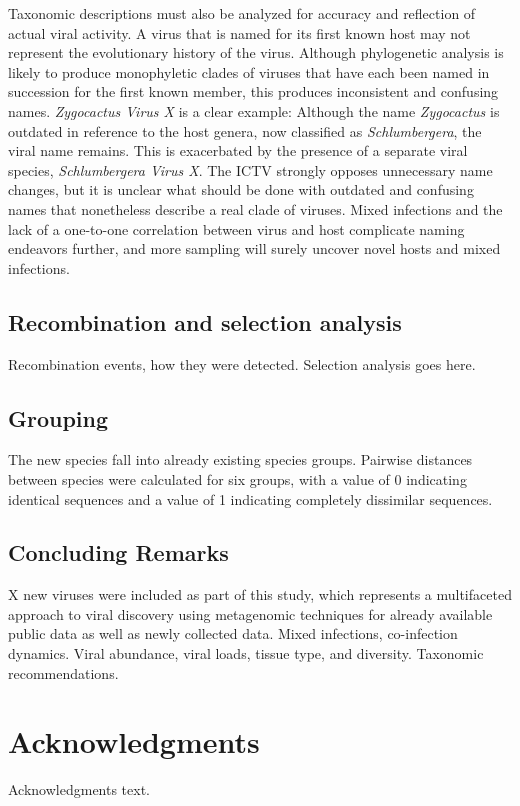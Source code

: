 \documentclass[11pt,letterpaper,titlepage]{article}
\begin{document}
\begin{linenumbers}
Taxonomic descriptions must also be analyzed for accuracy and reflection of actual viral activity. 
A virus that is named for its first known host may not represent the evolutionary history of the virus.
Although phylogenetic analysis is likely to produce monophyletic clades of viruses that have each been named in succession for the first known member, this produces inconsistent and confusing names.
\textit{Zygocactus Virus X} is a clear example: Although the name \textit{Zygocactus} is outdated in reference to the host genera, now classified as \textit{Schlumbergera}, the viral name remains.
This is exacerbated by the presence of a separate viral species, \textit{Schlumbergera Virus X}.
The ICTV strongly opposes unnecessary name changes, but it is unclear what should be done with outdated and confusing names that nonetheless describe a real clade of viruses.
Mixed infections and the lack of a one-to-one correlation between virus and host complicate naming endeavors further, and more sampling will surely uncover novel hosts and mixed infections.

\subsection*{Recombination and selection analysis}
Recombination events, how they were detected.
Selection analysis goes here.
\subsection*{Grouping}
The new species fall into already existing species groups.
Pairwise distances between species were calculated for six groups, with a value of 0 indicating identical sequences and a value of 1 indicating completely dissimilar sequences.

\subsection*{Concluding Remarks}
X new viruses were included as part of this study, which represents a multifaceted approach to viral discovery using metagenomic techniques for already available public data as well as newly collected data.
Mixed infections, co-infection dynamics.
Viral abundance, viral loads, tissue type, and diversity.
Taxonomic recommendations.
\section*{Acknowledgments}

Acknowledgments text.

\pagebreak
\raggedright{}
\setlength{\parindent}{0.0in}


\end{linenumbers}
\pagebreak
\frenchspacing
{}
\setlength{\parindent}{0.0in}
\end{document}
